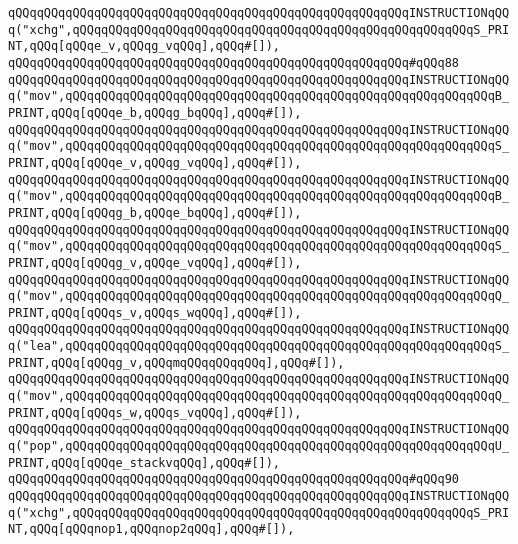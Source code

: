 \verb|qQQqqQQqqQQqqQQqqQQqqQQqqQQqqQQqqQQqqQQqqQQqqQQqqQQqqQQqINSTRUCTIONqQQq("xchg",qQQqqQQqqQQqqQQqqQQqqQQqqQQqqQQqqQQqqQQqqQQqqQQqqQQqqQQqS_PRINT,qQQq[qQQqe_v,qQQqg_vqQQq],qQQq#[]),|\newline
\verb|qQQqqQQqqQQqqQQqqQQqqQQqqQQqqQQqqQQqqQQqqQQqqQQqqQQqqQQq#qQQq88|\newline
\verb|qQQqqQQqqQQqqQQqqQQqqQQqqQQqqQQqqQQqqQQqqQQqqQQqqQQqqQQqINSTRUCTIONqQQq("mov",qQQqqQQqqQQqqQQqqQQqqQQqqQQqqQQqqQQqqQQqqQQqqQQqqQQqqQQqqQQqB_PRINT,qQQq[qQQqe_b,qQQqg_bqQQq],qQQq#[]),|\newline
\verb|qQQqqQQqqQQqqQQqqQQqqQQqqQQqqQQqqQQqqQQqqQQqqQQqqQQqqQQqINSTRUCTIONqQQq("mov",qQQqqQQqqQQqqQQqqQQqqQQqqQQqqQQqqQQqqQQqqQQqqQQqqQQqqQQqqQQqS_PRINT,qQQq[qQQqe_v,qQQqg_vqQQq],qQQq#[]),|\newline
\verb|qQQqqQQqqQQqqQQqqQQqqQQqqQQqqQQqqQQqqQQqqQQqqQQqqQQqqQQqINSTRUCTIONqQQq("mov",qQQqqQQqqQQqqQQqqQQqqQQqqQQqqQQqqQQqqQQqqQQqqQQqqQQqqQQqqQQqB_PRINT,qQQq[qQQqg_b,qQQqe_bqQQq],qQQq#[]),|\newline
\verb|qQQqqQQqqQQqqQQqqQQqqQQqqQQqqQQqqQQqqQQqqQQqqQQqqQQqqQQqINSTRUCTIONqQQq("mov",qQQqqQQqqQQqqQQqqQQqqQQqqQQqqQQqqQQqqQQqqQQqqQQqqQQqqQQqqQQqS_PRINT,qQQq[qQQqg_v,qQQqe_vqQQq],qQQq#[]),|\newline
\verb|qQQqqQQqqQQqqQQqqQQqqQQqqQQqqQQqqQQqqQQqqQQqqQQqqQQqqQQqINSTRUCTIONqQQq("mov",qQQqqQQqqQQqqQQqqQQqqQQqqQQqqQQqqQQqqQQqqQQqqQQqqQQqqQQqqQQqQ_PRINT,qQQq[qQQqs_v,qQQqs_wqQQq],qQQq#[]),|\newline
\verb|qQQqqQQqqQQqqQQqqQQqqQQqqQQqqQQqqQQqqQQqqQQqqQQqqQQqqQQqINSTRUCTIONqQQq("lea",qQQqqQQqqQQqqQQqqQQqqQQqqQQqqQQqqQQqqQQqqQQqqQQqqQQqqQQqqQQqS_PRINT,qQQq[qQQqg_v,qQQqmqQQqqQQqqQQq],qQQq#[]),|\newline
\verb|qQQqqQQqqQQqqQQqqQQqqQQqqQQqqQQqqQQqqQQqqQQqqQQqqQQqqQQqINSTRUCTIONqQQq("mov",qQQqqQQqqQQqqQQqqQQqqQQqqQQqqQQqqQQqqQQqqQQqqQQqqQQqqQQqqQQqQ_PRINT,qQQq[qQQqs_w,qQQqs_vqQQq],qQQq#[]),|\newline
\verb|qQQqqQQqqQQqqQQqqQQqqQQqqQQqqQQqqQQqqQQqqQQqqQQqqQQqqQQqINSTRUCTIONqQQq("pop",qQQqqQQqqQQqqQQqqQQqqQQqqQQqqQQqqQQqqQQqqQQqqQQqqQQqqQQqqQQqU_PRINT,qQQq[qQQqe_stackvqQQq],qQQq#[]),|\newline
\verb|qQQqqQQqqQQqqQQqqQQqqQQqqQQqqQQqqQQqqQQqqQQqqQQqqQQqqQQq#qQQq90|\newline
\verb|qQQqqQQqqQQqqQQqqQQqqQQqqQQqqQQqqQQqqQQqqQQqqQQqqQQqqQQqINSTRUCTIONqQQq("xchg",qQQqqQQqqQQqqQQqqQQqqQQqqQQqqQQqqQQqqQQqqQQqqQQqqQQqqQQqS_PRINT,qQQq[qQQqnop1,qQQqnop2qQQq],qQQq#[]),|\newline

